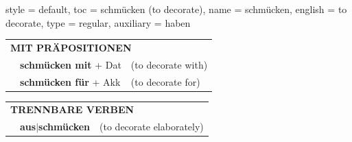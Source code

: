 \begin{verbentry}{
  style = {default},
  toc = {schmücken (to decorate)},
  name = {schmücken},
  english = {to decorate},
  type = {regular},
  auxiliary = {haben}
}
\vspace{10pt}

\begin{tabular}{lll}
\multicolumn{3}{l}{\textbf{MIT PRÄPOSITIONEN}}\\
& \textbf{schmücken mit} + Dat & (to decorate with)\\
& \textbf{schmücken für} + Akk & (to decorate for)\\
\end{tabular}
\hfill
\begin{tabular}{lll}
\multicolumn{3}{l}{\textbf{TRENNBARE VERBEN}}\\
& \textbf{aus$|$schmücken} & (to decorate elaborately)\\
\end{tabular}
\vspace{-5pt}
\end{verbentry}

